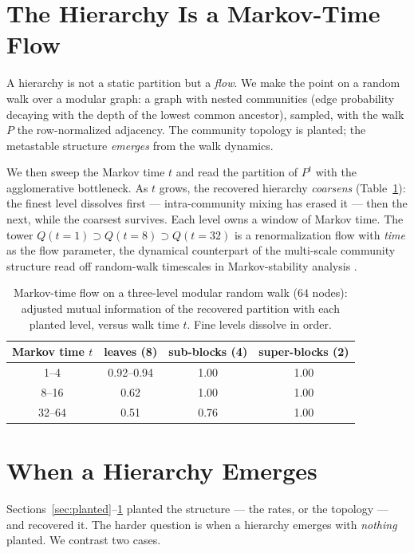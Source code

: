 \documentclass[11pt]{article}
\begin{document}
\section{The Hierarchy Is a Markov-Time Flow}
\label{sec:flow}

A hierarchy is not a static partition but a \emph{flow}. We make the point on a
random walk over a modular graph: a graph with nested communities (edge
probability decaying with the depth of the lowest common ancestor), sampled,
with the walk $P$ the row-normalized adjacency. The community topology is
planted; the metastable structure \emph{emerges} from the walk dynamics.

We then sweep the Markov time $t$ and read the partition of $P^t$ with the
agglomerative bottleneck. As $t$ grows, the recovered hierarchy
\emph{coarsens} (Table~\ref{tab:flow}): the finest level dissolves first ---
intra-community mixing has erased it --- then the next, while the coarsest
survives. Each level owns a window of Markov time. The tower
$Q(t{=}1) \supset Q(t{=}8) \supset Q(t{=}32)$ is a renormalization flow with
\emph{time} as the flow parameter, the dynamical counterpart of the multi-scale
community structure read off random-walk timescales in Markov-stability
analysis \citep{delvenne2010stability}.

\begin{table}[h]
\centering
\caption{Markov-time flow on a three-level modular random walk ($64$ nodes):
adjusted mutual information of the recovered partition with each planted level,
versus walk time $t$. Fine levels dissolve in order.}
\label{tab:flow}
\begin{tabular}{cccc}
\toprule
Markov time $t$ & leaves (8) & sub-blocks (4) & super-blocks (2) \\
\midrule
1--4   & 0.92--0.94 & 1.00 & 1.00 \\
8--16  & 0.62       & 1.00 & 1.00 \\
32--64 & 0.51       & 0.76 & 1.00 \\
\bottomrule
\end{tabular}
\end{table}

\section{When a Hierarchy Emerges}
\label{sec:emergence}

Sections~\ref{sec:planted}--\ref{sec:flow} planted the structure --- the rates,
or the topology --- and recovered it. The harder question is when a hierarchy
emerges with \emph{nothing} planted. We contrast two cases.
\end{document}

